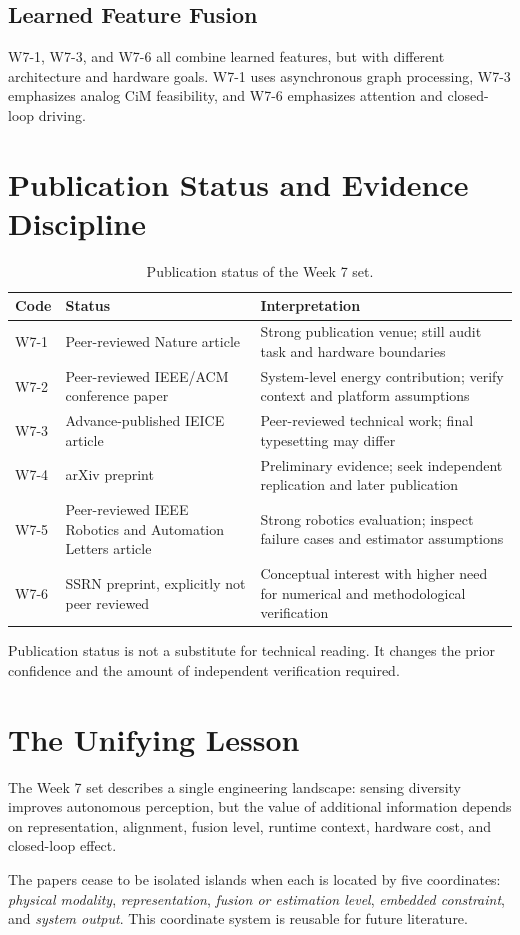 \subsection{Learned Feature Fusion}

W7-1, W7-3, and W7-6 all combine learned features, but with different architecture and hardware goals. W7-1 uses asynchronous graph processing, W7-3 emphasizes analog CiM feasibility, and W7-6 emphasizes attention and closed-loop driving.

\section{Publication Status and Evidence Discipline}

\begin{table}[H]
\centering
\caption{Publication status of the Week 7 set.}
\label{tab:publication-status}
\begin{tabularx}{\textwidth}{@{}p{1.3cm}p{4.1cm}X@{}}
\toprule
\textbf{Code} & \textbf{Status} & \textbf{Interpretation} \\
\midrule
W7-1 & Peer-reviewed Nature article & Strong publication venue; still audit task and hardware boundaries \\
W7-2 & Peer-reviewed IEEE/ACM conference paper & System-level energy contribution; verify context and platform assumptions \\
W7-3 & Advance-published IEICE article & Peer-reviewed technical work; final typesetting may differ \\
W7-4 & arXiv preprint & Preliminary evidence; seek independent replication and later publication \\
W7-5 & Peer-reviewed IEEE Robotics and Automation Letters article & Strong robotics evaluation; inspect failure cases and estimator assumptions \\
W7-6 & SSRN preprint, explicitly not peer reviewed & Conceptual interest with higher need for numerical and methodological verification \\
\bottomrule
\end{tabularx}
\end{table}

Publication status is not a substitute for technical reading. It changes the prior confidence and the amount of independent verification required.

\section{The Unifying Lesson}

\begin{keyinsight}
The Week 7 set describes a single engineering landscape: sensing diversity improves autonomous perception, but the value of additional information depends on representation, alignment, fusion level, runtime context, hardware cost, and closed-loop effect.
\end{keyinsight}

The papers cease to be isolated islands when each is located by five coordinates: \emph{physical modality}, \emph{representation}, \emph{fusion or estimation level}, \emph{embedded constraint}, and \emph{system output}. This coordinate system is reusable for future literature.
